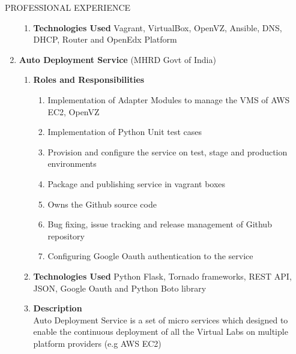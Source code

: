 \documentclass{resume} %
\newcommand{\blank}[1]{\hspace*{#1}}
\begin{document}
\begin{rSection}{PROFESSIONAL EXPERIENCE}
\begin{rSubsection}
\begin{enumerate}[label=\bfseries\arabic*]
\begin{enumerate}
  \item \textbf{Technologies Used } Vagrant, VirtualBox, OpenVZ,
    Ansible, DNS, DHCP, Router and OpenEdx Platform
  \end{enumerate}


\item \textbf {Auto Deployment Service} (MHRD Govt of India)
  \begin{enumerate}
    
  \item \textbf{Roles and Responsibilities}
    \begin{enumerate}
    \item Implementation of Adapter Modules to manage the VMS of AWS
      EC2, OpenVZ
    \item Implementation of Python Unit test cases
    \item Provision and configure the service on test, stage and
      production environments
    \item Package and publishing service in vagrant boxes
    \item Owns the Github source code
    \item Bug fixing, issue tracking and release management of Github
      repository
    \item Configuring Google Oauth authentication to the service
    \end{enumerate}
    
  \item \textbf{Technologies Used } Python Flask, Tornado
    frameworks, REST API, JSON, Google Oauth and Python Boto
    library
  \item \textbf{Description } \\
    \blank{2 cm}Auto Deployment Service is a set of micro services which designed to enable
    the continuous deployment of all the Virtual Labs on multiple platform
    providers (e.g AWS EC2)
  \end{enumerate}


\end{enumerate}
\end{rSubsection}

\end{rSection}


\end{document}
